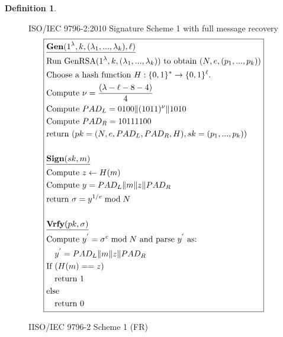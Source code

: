 \documentclass[]{final_report}
\theoremstyle{definition}
\newtheorem{definition}{Definition}[chapter]
\begin{document}
\begin{definition}
\begin{figure}[H]
\centering
\hfill ISO/IEC 9796-2:2010 Signature Scheme 1 with full message recovery\hfill\phantom{} 
\[
\boxed{
\begin{aligned}
&\underline{\textbf{\text{Gen}} (1^\lambda, k, (\lambda_{1},...,\lambda_{k}), \ell)} \\
&\text{Run GenRSA}(1^\lambda, k, (\lambda_{1},...,\lambda_{k})) \text{ to obtain } (N, e, (p_{1},...,p_{k})) \\
&\text{Choose a hash function } H : \{0, 1\}^* \rightarrow \{0, 1\}^\ell. \\
&\text{Compute } \nu = \frac{(\lambda - \ell - 8 - 4)}{4} \\
&\text{Compute } PAD_{L} = 0100 \| (1011)^{\nu} \| 1010 \\
&\text{Compute } PAD_{R} = 10111100 \\
&\text{return } (pk = (N, e, PAD_{L}, PAD_{R}, H), sk = (p_{1},...,p_{k})) \\
\\
&\underline{\textbf{\text{Sign}} (sk, m)} \\
&\text{Compute } z \leftarrow H(m) \\
&\text{Compute } y = PAD_{L} \| m \| z \| PAD_{R} \\
&\text{return } \sigma = y^{1/e} \bmod N \\
\\
&\underline{\textbf{\text{Vrfy}} (pk, \sigma)} \\
&\text{Compute } y^{'} = \sigma^{e} \bmod N \text{ and parse } y^{'} \text{ as: } \\
&\quad y^{'} = PAD_{L} \| m \| z \| PAD_{R} \\
&\text{If } (H(m) == z) \\
&\quad \text{return } 1 \\
&\text{else} \\
&\quad \text{return } 0 
\end{aligned}
}
\]
\caption{IISO/IEC 9796-2 Scheme 1 (FR)}
\label{fig:isoiec9796-full}
\end{figure}
\end{definition}
\end{document}
